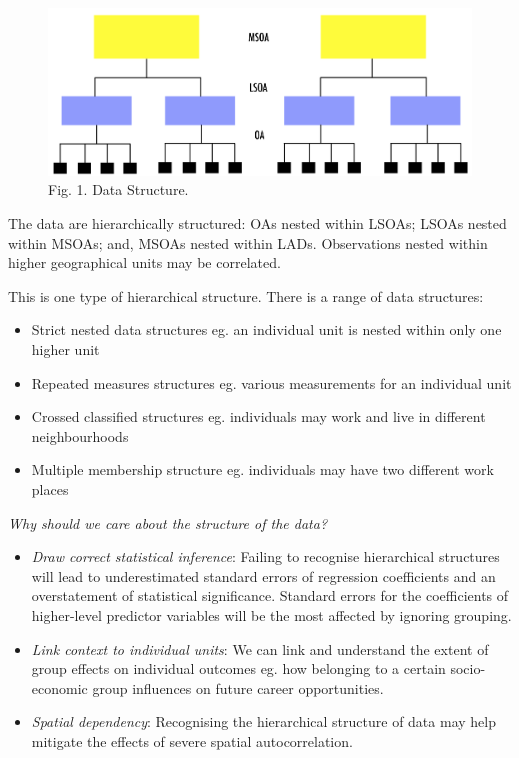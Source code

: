 \documentclass[
]{book}
\begin{document}
\begin{figure}
\centering
\includegraphics{figs/ch5/datastr.png}
\caption{Fig. 1. Data Structure.}
\end{figure}

The data are hierarchically structured: OAs nested within LSOAs; LSOAs nested within MSOAs; and, MSOAs nested within LADs. Observations nested within higher geographical units may be correlated.

This is one type of hierarchical structure. There is a range of data structures:

\begin{itemize}
\item
  Strict nested data structures eg. an individual unit is nested within only one higher unit
\item
  Repeated measures structures eg. various measurements for an individual unit
\item
  Crossed classified structures eg. individuals may work and live in different neighbourhoods
\item
  Multiple membership structure eg. individuals may have two different work places
\end{itemize}

\emph{Why should we care about the structure of the data?}

\begin{itemize}
\item
  \emph{Draw correct statistical inference}: Failing to recognise hierarchical structures will lead to underestimated standard errors of regression coefficients and an overstatement of statistical significance. Standard errors for the coefficients of higher-level predictor variables will be the most affected by ignoring grouping.
\item
  \emph{Link context to individual units}: We can link and understand the extent of group effects on individual outcomes eg. how belonging to a certain socio-economic group influences on future career opportunities.
\item
  \emph{Spatial dependency}: Recognising the hierarchical structure of data may help mitigate the effects of severe spatial autocorrelation.
\end{itemize}
\end{document}
